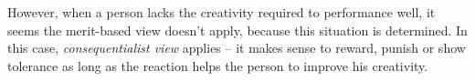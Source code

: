 However, when a person lacks the creativity required to performance well, it seems the merit-based view doesn't apply, because this situation is determined. In this case, \emph{consequentialist view} applies -- it makes sense to reward, punish or show tolerance as long as the reaction helps the person to improve his creativity.




